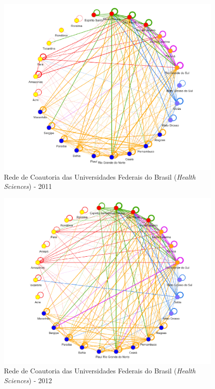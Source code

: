 \begin{figure}[H]
	\centering
	\includegraphics[scale=0.6]{Imagens/rede-2011.pdf}
	\caption{Rede de Coautoria das Universidades Federais do Brasil (\textit{Health Sciences}) - 2011}
	\label{Rede de Coautoria - UF BR 2011}
\end{figure}


\begin{figure}[H]
	\centering
	\includegraphics[scale=0.6]{Imagens/rede-2012.pdf}
	\caption{Rede de Coautoria das Universidades Federais do Brasil (\textit{Health Sciences}) - 2012}
	\label{Rede de Coautoria - UF BR 2012}
\end{figure}

